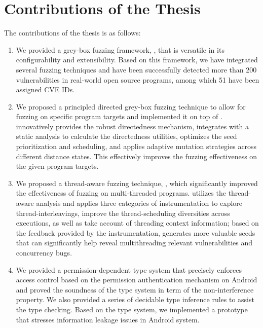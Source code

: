 \section{Contributions of the Thesis}
The contributions of the thesis is as follows:
\begin{enumerate}
	\item We provided a grey-box fuzzing framework, \FOT, that is versatile in its configurability and extensibility. Based on this framework, we have integrated several fuzzing techniques and have been successfully detected more than 200 vulnerabilities in real-world open source programs, among which 51 have been assigned CVE IDs.
	\item We proposed a principled directed grey-box fuzzing technique \dFOT to allow for fuzzing on specific program targets and implemented it on top of \FOT. \dFOT innovatively provides the robust directedness mechanism, integrates with a static analysis to calculate the directedness utilities, optimizes the seed prioritization and scheduling, and applies adaptive mutation strategies across different distance states. This effectively improves the fuzzing effectiveness on the given program targets.
	\item We proposed a thread-aware fuzzing technique, \mtfuzz, which significantly improved the effectiveness of fuzzing on multi-threaded programs. \mtfuzz utilizes the thread-aware analysis and applies three categories of instrumentation to explore thread-interleavings,  improve the thread-scheduling diversities across executions, as well as take account of threading context information; based on the feedback provided by the instrumentation, \mtfuzz generates more valuable seeds that can significantly help reveal multithreading relevant vulnerabilities and concurrency bugs.
	\item We provided a permission-dependent type system that precisely enforces access control based on the permission authentication mechanism on Android and proved the soundness of the type system in term of the non-interference property. We also provided a series of decidable type inference rules to assist the type checking. Based on the type system, we implemented a prototype that stresses information leakage issues in Android system.
\end{enumerate}


